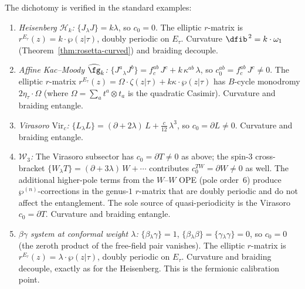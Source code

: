 \begin{remark}
\label{rem:elliptic-dichotomy-examples}
The dichotomy is verified in the standard examples:
\begin{enumerate}[label=(\roman*)]
\item \emph{Heisenberg $\mathcal{H}_k$:}
 $\{J {}_\lambda J\} = k\lambda$, so $c_0 = 0$.
 The elliptic $r$-matrix is
 $r^{E_\tau}(z) = k \cdot \wp(z|\tau)$,
 doubly periodic on $E_\tau$. Curvature
 $\dfib^{\,2} = k \cdot \omega_1$
 (Theorem~\ref{thm:rosetta-curved}) and braiding decouple.

\item \emph{Affine Kac--Moody $\widehat{\fg}_k$:}
 $\{J^a {}_\lambda J^b\} = f^{ab}_c\, J^c +
 k\,\kappa^{ab}\,\lambda$,
 so $c_0^{ab} = f^{ab}_c\, J^c \ne 0$.
 The elliptic $r$-matrix
 $r^{E_\tau}(z) = \Omega \cdot \zeta(z|\tau) +
 k\kappa \cdot \wp(z|\tau)$
 has $B$-cycle monodromy $2\eta_\tau \cdot \Omega$
 (where $\Omega = \sum_a t^a \otimes t_a$ is the quadratic
 Casimir). Curvature and braiding entangle.

\item \emph{Virasoro $\mathrm{Vir}_c$:}
 $\{L {}_\lambda L\} = (\partial + 2\lambda)\,L +
 \tfrac{c}{12}\,\lambda^3$,
 so $c_0 = \partial L \ne 0$.
 Curvature and braiding entangle.

\item \emph{$\mathcal{W}_3$:}
 The Virasoro subsector has $c_0 = \partial T \ne 0$
 as above; the spin-$3$ cross-bracket
 $\{W {}_\lambda T\} = (\partial + 3\lambda)\,W + \cdots$
 contributes $c_0^{TW} = \partial W \ne 0$ as well.
 The additional higher-pole terms from the
 $W$--$W$ OPE (pole order~$6$) produce
 $\wp^{(n)}$-corrections in the genus-$1$
 $r$-matrix that are doubly periodic and do not
 affect the entanglement. The sole source of
 quasi-periodicity is the Virasoro $c_0 = \partial T$.
 Curvature and braiding entangle.

\item \emph{$\beta\gamma$ system at conformal weight $\lambda$:}
 $\{\beta {}_\lambda \gamma\} = 1$,
 $\{\beta {}_\lambda \beta\} = \{\gamma {}_\lambda \gamma\} = 0$,
 so $c_0 = 0$ (the zeroth product of the free-field pair vanishes).
 The elliptic $r$-matrix is
 $r^{E_\tau}(z) = \lambda \cdot \wp(z|\tau)$,
 doubly periodic on $E_\tau$.
 Curvature and braiding decouple, exactly as for
 the Heisenberg. This is the fermionic calibration point.
\end{enumerate}
\end{remark}

